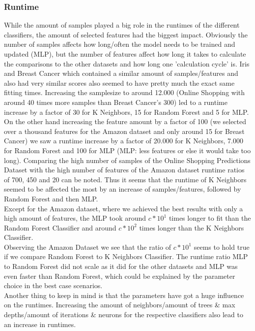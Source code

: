 \subsubsection{Runtime}
While the amount of samples played a big role in the runtimes of the different classifiers, the amount of selected features had the biggest impact. Obviously the number of samples affects how long/often the model needs to be trained and updated (MLP), but the number of features affect how long it takes to calculate the comparisons to the other datasets and how long one 'calculation cycle' is. Iris and Breast Cancer which contained a similar amount of samples/features and also had very similar scores also seemed to  have pretty much the exact same fitting times. Increasing the samplesize to around 12.000 (Online Shopping with around 40 times more samples than Breast Cancer's 300) led to a runtime increase by a factor of 30 for K Neighbors, 15 for Random Forest and 5 for MLP.\\ On the other hand increasing the feature amount by a factor of 100 (we selected over a thousand features for the Amazon dataset and only around 15 for Breast Cancer) we saw a runtime increase by a factor of 20.000 for K Neighbors, 7.000 for Random Forest and 100 for MLP (MLP: less features or else it would take too long). 
Comparing the high number of samples of the Online Shopping Predictions Dataset with the high number of features of the Amazon dataset runtime ratios of 700, 450 and 20 can be noted. Thus it seems that the runtime of K Neighbors seemed to be affected the most by an increase of samples/features, followed by Random Forest and then MLP. \\
\newline
Except for the Amazon dataset, where we achieved the best results with only a high amount of features, the MLP took around $c*10^1$ times longer to fit than the Random Forest Classifier and around $c* 10^2$ times longer than the K Neighbors Classifier.\\
Observing the Amazon Dataset we see that the ratio of $c*10^1$ seems to hold true if we compare Random Forest to K Neighbors Classifier. The runtime ratio MLP to Random Forest did not scale as it did for the other datasets and MLP was even faster than Random Forest, which could be explained by the parameter choice in the best case scenarios. \\
Another thing to keep in mind is that the parameters have got a huge influence on the runtimes. Increasing the amount of neighbors/amount of trees \& max depths/amount of iterations \& neurons for the respective classifiers also lead to an increase in runtimes.

